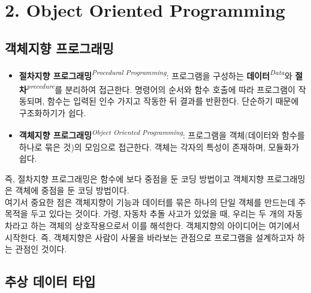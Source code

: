 \section[2. Object Oriented Programming - {\it 객체지향}]{2. Object Oriented Programming}

\subsection{객체지향 프로그래밍}

\begin{itemize}

\item \textbf{절차지향 프로그래밍}\textit{\textsuperscript{Procedural Programming}}: 프로그램을 구성하는 \textbf{데이터}\textit{\textsuperscript{Data}}와 \textbf{절차}\textit{\textsuperscript{precedure}}를 분리하여 접근한다. 명령어의 순서와 함수 호출에 따라 프로그램이 작동되며, 함수는 입력된 인수 가지고 작동한 뒤 결과를 반환한다. 단순하기 때문에 구조화하기가 쉽다.
\item \textbf{객체지향 프로그래밍}\textit{\textsuperscript{Object Oriented Programming}}: 프로그램을 객체(데이터와 함수를 하나로 묶은 것)의 모임으로 접근한다. 객체는 각자의 특성이 존재하며, 모듈화가 쉽다.
\end{itemize}
즉, 절차지향 프로그래밍은 함수에 보다 중점을 둔 코딩 방법이고 객체지향 프로그래밍은 객체에 중점을 둔 코딩 방법이다.\\
여기서 중요한 점은 객체지향이 기능과 데이터를 묶은 하나의 단일 객체를 만드는데 주 목적을 두고 있다는 것이다. 가령, 자동차 추돌 사고가 있었을 때, 우리는 두 개의 자동차라고 하는 객체의 상호작용으로서 이를 해석한다. 객체지향의 아이디어는 여기에서 시작한다. 즉, 객체지향은 사람이 사물을 바라보는 관점으로 프로그램을 설계하고자 하는 관점인 것이다.

\subsection{추상 데이터 타입}

